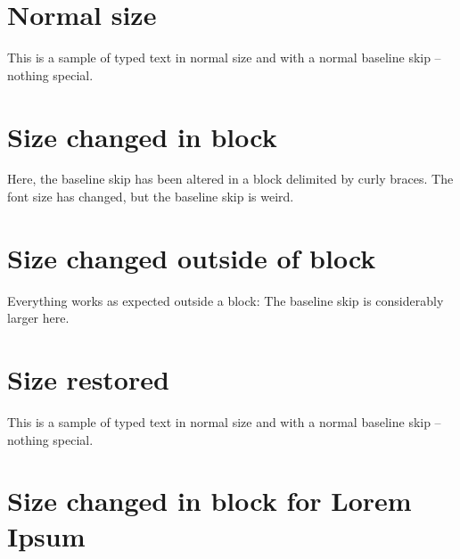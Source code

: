 \documentclass{scrartcl}
\begin{document}
\section{Normal size}

This is a sample of typed text in normal size and with a normal baseline skip -- nothing special.

\section{Size changed in block}

  {\fontsize{15}{20}\selectfont
Here, the baseline skip has been altered in a block delimited by curly braces. The font size has changed, but the baseline skip is weird.\par
  }

\section{Size changed outside of block}

  \fontsize{15}{20}\selectfont
Everything works as expected outside a block: The baseline skip is considerably larger here.

\section{Size restored}

\normalsize
This is a sample of typed text in normal size and with a normal baseline skip -- nothing special.

\section{Size changed in block for Lorem Ipsum}

  {\fontsize{15}{20}\selectfont\lipsum[1]}
  
\end{document}

